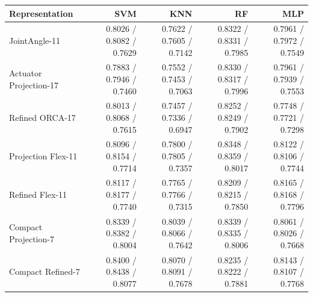 \begin{tabular}{lrrrr}
\toprule
Representation & SVM & KNN & RF & MLP \\
\midrule
JointAngle-11 & 0.8026 / 0.8082 / 0.7629 & 0.7622 / 0.7605 / 0.7142 & 0.8322 / 0.8331 / 0.7985 & 0.7961 / 0.7972 / 0.7549 \\
Actuator Projection-17 & 0.7883 / 0.7946 / 0.7460 & 0.7552 / 0.7453 / 0.7063 & 0.8330 / 0.8317 / 0.7996 & 0.7961 / 0.7939 / 0.7553 \\
Refined ORCA-17 & 0.8013 / 0.8068 / 0.7615 & 0.7457 / 0.7336 / 0.6947 & 0.8252 / 0.8249 / 0.7902 & 0.7748 / 0.7721 / 0.7298 \\
Projection Flex-11 & 0.8096 / 0.8154 / 0.7714 & 0.7800 / 0.7805 / 0.7357 & 0.8348 / 0.8359 / 0.8017 & 0.8122 / 0.8106 / 0.7744 \\
Refined Flex-11 & 0.8117 / 0.8177 / 0.7740 & 0.7765 / 0.7766 / 0.7315 & 0.8209 / 0.8215 / 0.7850 & 0.8165 / 0.8168 / 0.7796 \\
Compact Projection-7 & 0.8339 / 0.8382 / 0.8004 & 0.8039 / 0.8066 / 0.7642 & 0.8339 / 0.8335 / 0.8006 & 0.8061 / 0.8026 / 0.7668 \\
Compact Refined-7 & 0.8400 / 0.8438 / 0.8077 & 0.8070 / 0.8091 / 0.7678 & 0.8235 / 0.8222 / 0.7881 & 0.8143 / 0.8107 / 0.7768 \\
\bottomrule
\end{tabular}
